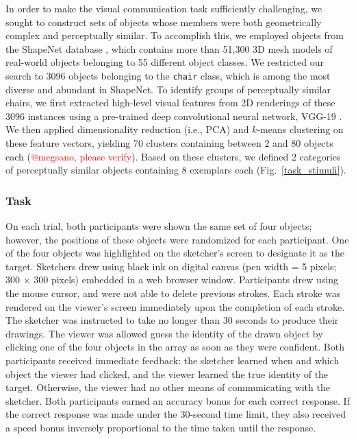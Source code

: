 \documentclass[10pt,letterpaper]{article}
\newcommand{\red}[1]{\textcolor{Red}{#1}}
\begin{document}
In order to make the visual communication task sufficiently challenging, we sought to construct sets of objects whose members were both geometrically complex and perceptually similar. 
To accomplish this, we employed objects from the ShapeNet database \cite{chang2015shapenet}, which contains more than 51,300 3D mesh models of real-world objects belonging to 55 different object classes.
We restricted our search to 3096 objects belonging to the \texttt{chair} class, which is among the most diverse and abundant in ShapeNet. 
To identify groups of perceptually similar chairs, we first extracted high-level visual features from 2D renderings of these 3096 instances using a pre-trained deep convolutional neural network, VGG-19 \cite{simonyan2014very}.   
We then applied dimensionality reduction (i.e., PCA) and $k$-means clustering on these feature vectors, yielding 70 clusters containing between 2 and 80 objects each (\red{@megsano, please verify}).
Based on these clusters, we defined 2 categories of perceptually similar objects containing 8 exemplars each (Fig.~\ref{task_stimuli}). 

\subsubsection{Task} 

On each trial, both participants were shown the same set of four objects; however, the positions of these objects were randomized for each participant. 
One of the four objects was highlighted on the sketcher's screen to designate it as the target.
Sketchers drew using black ink on digital canvas (pen width = 5 pixels; 300 $\times$ 300 pixels) embedded in a web browser window. 
Participants drew using the mouse cursor, and were not able to delete previous strokes. 
Each stroke was rendered on the viewer's screen immediately upon the completion of each stroke.
The sketcher was instructed to take no longer than 30 seconds to produce their drawings. 
The viewer was allowed guess the identity of the drawn object by clicking one of the four objects in the array as soon as they were confident. 
Both participants received immediate feedback: the sketcher learned when and which object the viewer had clicked, and the viewer learned the true identity of the target. 
Otherwise, the viewer had no other means of communicating with the sketcher. 
Both participants earned an accuracy bonus for each correct response. 
If the correct response was made under the 30-second time limit, they also received a speed bonus inversely proportional to the time taken until the response.
\end{document}
